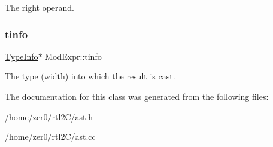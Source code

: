 The right operand. \mbox{\label{class_mod_expr_ae1372863ba85d1d2e1eb1e1e675d1ad4}} 
\subsubsection{\texorpdfstring{tinfo}{tinfo}}
{\footnotesize\ttfamily \hyperlink{class_type_info}{Type\+Info}$\ast$ Mod\+Expr\+::tinfo\hspace{0.3cm}{\ttfamily [protected]}}

The type (width) into which the result is cast. 

The documentation for this class was generated from the following files\+:\begin{DoxyCompactItemize}
\item 
/home/zer0/rtl2\+C/ast.\+h\item 
/home/zer0/rtl2\+C/ast.\+cc\end{DoxyCompactItemize}
